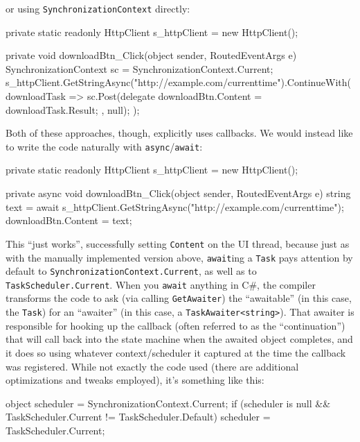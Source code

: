 \documentclass[a4paper,12pt,notitlepage,twoside,openright]{article}
\begin{document}
or using \texttt{SynchronizationContext} directly:

\begin{csharpcode}
private static readonly HttpClient s_httpClient = new HttpClient();

private void downloadBtn_Click(object sender, RoutedEventArgs e)
{
    SynchronizationContext sc = SynchronizationContext.Current;
    s_httpClient.GetStringAsync("http://example.com/currenttime").ContinueWith(downloadTask =>
    {
        sc.Post(delegate
        {
            downloadBtn.Content = downloadTask.Result;
        }, null);
    });
}
\end{csharpcode}

Both of these approaches, though, explicitly uses callbacks. We would
instead like to write the code naturally with
\texttt{async}/\texttt{await}:

\begin{csharpcode}
private static readonly HttpClient s_httpClient = new HttpClient();

private async void downloadBtn_Click(object sender, RoutedEventArgs e)
{
    string text = await s_httpClient.GetStringAsync("http://example.com/currenttime");
    downloadBtn.Content = text;
}
\end{csharpcode}

This ``just works'', successfully setting \texttt{Content} on the UI
thread, because just as with the manually implemented version above,
\texttt{await}ing a \texttt{Task} pays attention by default to
\texttt{SynchronizationContext.Current}, as well as to
\texttt{TaskScheduler.Current}. When you \texttt{await} anything in C\#,
the compiler transforms the code to ask (via calling
\texttt{GetAwaiter}) the ``awaitable'' (in this case, the \texttt{Task})
for an ``awaiter'' (in this case, a
\texttt{TaskAwaiter\textless{}string\textgreater{}}). That awaiter is
responsible for hooking up the callback (often referred to as the
``continuation'') that will call back into the state machine when the
awaited object completes, and it does so using whatever
context/scheduler it captured at the time the callback was registered.
While not exactly the code used (there are additional optimizations and
tweaks employed), it's something like this:

\begin{csharpcode}
object scheduler = SynchronizationContext.Current;
if (scheduler is null && TaskScheduler.Current != TaskScheduler.Default)
{
    scheduler = TaskScheduler.Current;
}
\end{csharpcode}
\end{document}

